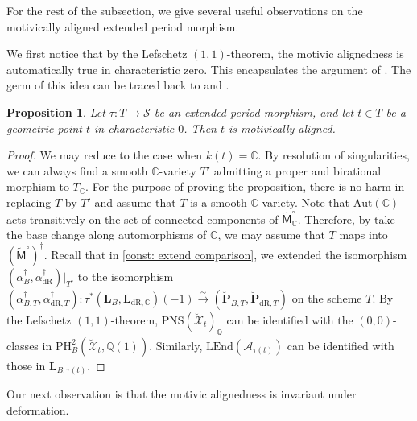 \documentclass[11pt, letterpaper]{amsart}
\theoremstyle{plain}
\newtheorem{proposition}[theorem]{Proposition}
\theoremstyle{definition}
\newcommand{\IC}{\mathbb{C}}
\newcommand{\IQ}{\mathbb{Q}}
\newcommand{\Aut}{\mathrm{Aut}}
\newcommand{\<}{\langle}
\renewcommand{\>}{\rangle}
\def\wt{\widetilde}
\newcommand{\shS}{\mathscr{S}}
\newcommand{\sfM}{\mathsf{M}}
\newcommand{\sA}{\mathcal{A}}
\newcommand{\sX}{\mathcal{X}}
\newcommand{\bL}{\mathbf{L}}
\newcommand{\LEnd}{\mathrm{LEnd}}
\newcommand{\PH}{\mathrm{PH}}
\newcommand{\PNS}{\mathrm{PNS}}
\newcommand{\bP}{\mathbf{P}}
\newcommand{\dR}{\mathrm{dR}}
\newcommand{\sto}{\stackrel{\sim}{\to}}
\begin{document}
For the rest of the subsection, we give several useful observations on the motivically aligned extended period morphism.

We first notice that by the Lefschetz $(1,1)$-theorem, the motivic alignedness is automatically true in characteristic zero.
This encapsulates the argument of \cite[Thm.~5.17(4)]{MPTate}.
The germ of this idea can be traced back to \cite{Nygaard} and \cite{NO}. 


\begin{proposition}
\label{prop: char 0 motivically aligned}
    Let $\tau:T\to \shS$ be an extended period morphism, and let $t\in T$ be a geometric point $t$ in characteristic $0$.
    Then $t$ is motivically aligned. 
\end{proposition}
\begin{proof}
    We may reduce to the case when $k(t) = \IC$. By resolution of singularities, we can always find a smooth $\IC$-variety $T'$ admitting a proper and birational morphism to $T_\IC$. 
    For the purpose of proving the proposition, there is no harm in replacing $T$ by $T'$ and assume that $T$ is a smooth $\IC$-variety. 
    Note that $\Aut(\IC)$ acts transitively on the set of connected components of $\wt{\sfM}^\circ_\IC$. 
    Therefore, by take the base change along automorphisms of $\IC$, we may assume that $T$ maps into $(\wt{\sfM}^\circ)^\dagger$. Recall that in \cref{const: extend comparison}, we extended the isomorphism $(\alpha^\dagger_B, \alpha^\dagger_\dR)|_{T^\circ}$ to the isomorphism $(\alpha^\dagger_{B, T}, \alpha^\dagger_{\dR, T}) : \tau^*(\bL_B, \bL_{\dR, \IC})(-1) \sto (\breve{\bP}_{B, T}, \breve{\bP}_{\dR, T})$ on the scheme $T$. 
    By the Lefschetz $(1, 1)$-theorem, $\PNS(\breve{\sX}_t)_\IQ$ can be identified with the $(0, 0)$-classes in $\PH^2_{B}(\breve{\sX}_{t}, \IQ(1))$. 
    Similarly, $\LEnd(\sA_{\tau(t)})$ can be identified with those in $\bL_{B, \tau(t)}$. 
\end{proof}


Our next observation is that the motivic alignedness is invariant under deformation. 
\end{document}
